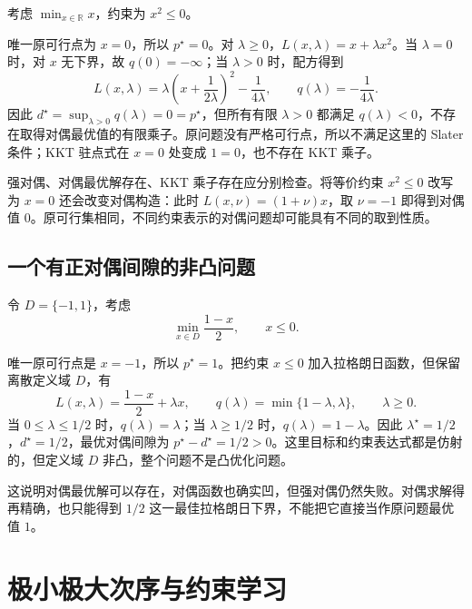 \documentclass[UTF8]{ctexart}
\begin{document}
\begin{example}[上确界没有被取到]
考虑 $\min_{x\in\mathbb R}x$，约束为 $x^2\leq0$。
\end{example}
\begin{solve}
唯一原可行点为 $x=0$，所以 $p^\star=0$。对 $\lambda\geq0$，$L(x,\lambda)=x+\lambda x^2$。当 $\lambda=0$ 时，对 $x$ 无下界，故 $q(0)=-\infty$；当 $\lambda>0$ 时，配方得到
\[
 L(x,\lambda)=\lambda\left(x+\frac{1}{2\lambda}\right)^2
                    -\frac{1}{4\lambda},
 \qquad q(\lambda)=-\frac{1}{4\lambda}.
\]
因此 $d^\star=\sup_{\lambda>0}q(\lambda)=0=p^\star$，但所有有限 $\lambda>0$ 都满足 $q(\lambda)<0$，不存在取得对偶最优值的有限乘子。原问题没有严格可行点，所以不满足这里的 Slater 条件；KKT 驻点式在 $x=0$ 处变成 $1=0$，也不存在 KKT 乘子。
\end{solve}

强对偶、对偶最优解存在、KKT 乘子存在应分别检查。将等价约束 $x^2\leq0$ 改写为 $x=0$ 还会改变对偶构造：此时 $L(x,\nu)=(1+\nu)x$，取 $\nu=-1$ 即得到对偶值 $0$。原可行集相同，不同约束表示的对偶问题却可能具有不同的取到性质。

\subsection{一个有正对偶间隙的非凸问题}

\begin{example}[离散定义域使下界不能达到原最优值]
\label{ex:duality-gap}
令 $D=\{-1,1\}$，考虑
\[
 \min_{x\in D}\frac{1-x}{2},\qquad x\leq0.
\]
\end{example}
\begin{solve}
唯一原可行点是 $x=-1$，所以 $p^\star=1$。把约束 $x\leq0$ 加入拉格朗日函数，但保留离散定义域 $D$，有
\[
 L(x,\lambda)=\frac{1-x}{2}+\lambda x,
 \qquad q(\lambda)=\min\{1-\lambda,\lambda\},\qquad\lambda\geq0.
\]
当 $0\leq\lambda\leq1/2$ 时，$q(\lambda)=\lambda$；当 $\lambda\geq1/2$ 时，$q(\lambda)=1-\lambda$。因此 $\lambda^\star=1/2$，$d^\star=1/2$，最优对偶间隙为 $p^\star-d^\star=1/2>0$。这里目标和约束表达式都是仿射的，但定义域 $D$ 非凸，整个问题不是凸优化问题。
\end{solve}

这说明对偶最优解可以存在，对偶函数也确实凹，但强对偶仍然失败。对偶求解得再精确，也只能得到 $1/2$ 这一最佳拉格朗日下界，不能把它直接当作原问题最优值 $1$。

\section{极小极大次序与约束学习}
\label{sec:duality-minimax}
\end{document}

